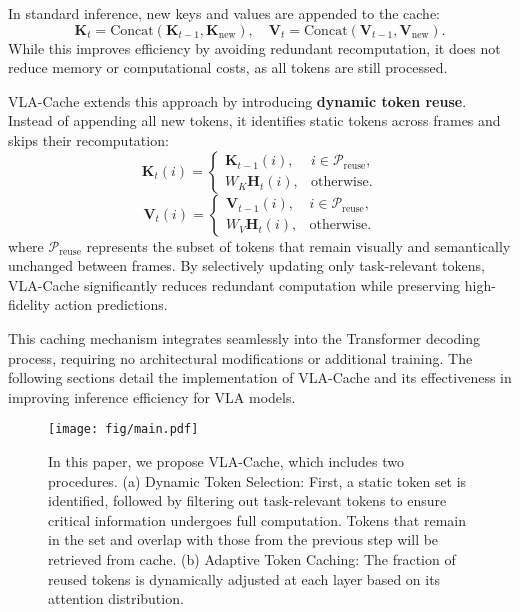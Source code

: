 In standard inference, new keys and values are appended to the cache:
\begin{equation}
\mathbf{K}_t = \mathrm{Concat}(\mathbf{K}_{t-1}, \mathbf{K}_{\text{new}}), \quad
\mathbf{V}_t = \mathrm{Concat}(\mathbf{V}_{t-1}, \mathbf{V}_{\text{new}}).
\end{equation}
While this improves efficiency by avoiding redundant recomputation, it does not reduce memory or computational costs, as all tokens are still processed.

VLA-Cache extends this approach by introducing \textbf{dynamic token reuse}. Instead of appending all new tokens, it identifies static tokens across frames and skips their recomputation:
\begin{equation}
\mathbf{K}_t(i) =
\begin{cases}
\mathbf{K}_{t-1}(i), & i \in \mathcal{P}_{\text{reuse}}, \\
W_K \mathbf{H}_t(i), & \text{otherwise}.
\end{cases}
\end{equation}
\begin{equation}
\mathbf{V}_t(i) =
\begin{cases}
\mathbf{V}_{t-1}(i), & i \in \mathcal{P}_{\text{reuse}}, \\
W_V \mathbf{H}_t(i), & \text{otherwise}.
\end{cases}
\end{equation}
where $\mathcal{P}_{\text{reuse}}$ represents the subset of tokens that remain visually and semantically unchanged between frames. By selectively updating only task-relevant tokens, VLA-Cache significantly reduces redundant computation while preserving high-fidelity action predictions.

This caching mechanism integrates seamlessly into the Transformer decoding process, requiring no architectural modifications or additional training. The following sections detail the implementation of VLA-Cache and its effectiveness in improving inference efficiency for VLA models.


\begin{figure*}[t]
\centering
{\texttt{[image: fig/main.pdf]}}
\caption{In this paper, we propose VLA-Cache, which includes two procedures. (a) Dynamic Token Selection: First, a static token set is identified, followed by filtering out task-relevant tokens to ensure critical information undergoes full computation. Tokens that remain in the set and overlap with those from the previous step will be retrieved from cache.
(b) Adaptive Token Caching: The fraction of reused tokens is dynamically adjusted at each layer based on its attention distribution.
}
\label{fig:method}
\vspace{-0.2 cm}
\end{figure*}


